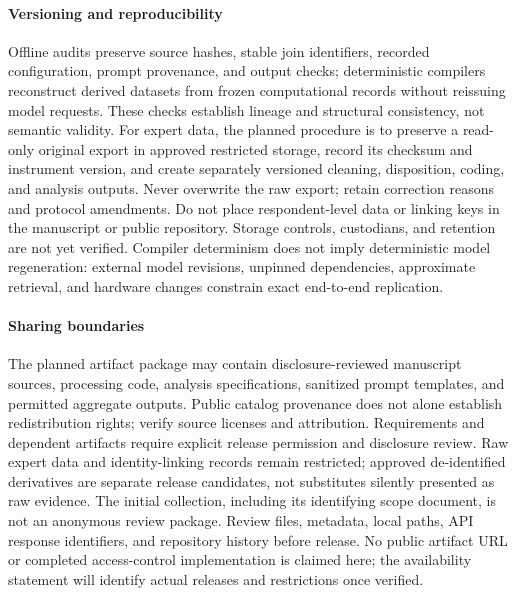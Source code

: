 \paragraph{Versioning and reproducibility}
Offline audits preserve source hashes, stable join identifiers, recorded
configuration, prompt provenance, and output checks; deterministic compilers
reconstruct derived datasets from frozen computational records without
reissuing model requests. These checks establish lineage and structural
consistency, not semantic validity. For expert data, the planned procedure
is to preserve a read-only original export in approved restricted storage,
record its checksum and instrument version, and create separately versioned
cleaning, disposition, coding, and analysis outputs. Never overwrite the raw
export; retain correction reasons and protocol amendments. Do not place
respondent-level data or linking keys in the manuscript or public repository.
Storage controls, custodians, and retention are not yet verified.
Compiler determinism does not imply deterministic model regeneration:
external model revisions, unpinned dependencies, approximate retrieval,
and hardware changes constrain exact end-to-end replication.

\paragraph{Sharing boundaries}
The planned artifact package may contain disclosure-reviewed manuscript
sources, processing code, analysis specifications, sanitized prompt templates,
and permitted aggregate outputs. Public catalog provenance does not alone
establish redistribution rights; verify source licenses and attribution.
Requirements and dependent artifacts require explicit release permission
and disclosure review. Raw expert data and identity-linking records remain
restricted; approved de-identified derivatives are separate release
candidates, not substitutes silently presented as raw evidence.
The initial collection, including its identifying scope document, is not
an anonymous review package. Review files, metadata, local paths, API response
identifiers, and repository history before release. No public artifact URL
or completed access-control implementation is claimed here; the availability
statement will identify actual releases and restrictions once verified.

